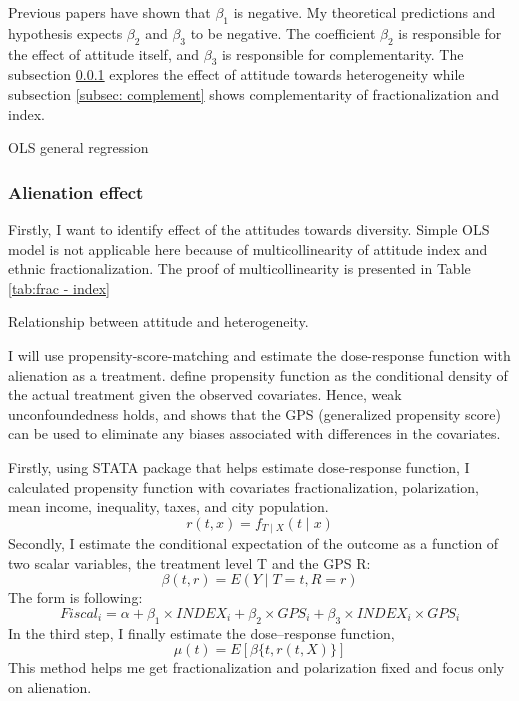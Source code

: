 \documentclass[12pt]{article}
\begin{document}
Previous papers have shown that $\beta_1$ is negative. My theoretical predictions and hypothesis expects $\beta_2$ and $\beta_3$ to be negative. The coefficient $\beta_2$ is responsible for the effect of attitude itself, and $\beta_3$ is responsible for complementarity. The subsection \ref{subsec: alienation} explores the effect of attitude towards heterogeneity while subsection \ref{subsec: complement} shows complementarity of fractionalization and index.

\begin{table}[h!]
    \centering
    \scriptsize
    
    \caption{OLS general regression}
    \label{tab:basic}
\end{table}

\subsubsection{Alienation effect}
\label{subsec: alienation}

Firstly, I want to identify effect of the attitudes towards diversity. Simple OLS model is not applicable here because of multicollinearity of attitude index and ethnic fractionalization. The proof of multicollinearity is presented in Table \ref{tab:frac - index}

\begin{table}[h!]
    \centering
    \scriptsize
    
    \caption{Relationship between attitude and heterogeneity.}
    \label{tab:frac - index}
\end{table}

I will use propensity-score-matching and estimate the dose-response function with alienation as a treatment. \cite{prop} define propensity function as the conditional density of the actual treatment given the observed covariates. Hence, weak unconfoundedness holds, and \cite{prop} shows that the GPS (generalized propensity score) can be used to eliminate any biases associated with differences in the covariates.

Firstly, using \cite{package} STATA package that helps estimate dose-response function, I calculated propensity function with covariates fractionalization, polarization, mean income, inequality, taxes, and city population.
\[ r(t, x)=f_{T \mid X}(t \mid x) \]
Secondly, I estimate the conditional expectation of
the outcome as a function of two scalar variables, the treatment level T and the GPS R:
\[ \beta(t, r)=E(Y \mid T=t, R=r) \]
The form is following:
\[ Fiscal_i = \alpha + \beta_1 \times INDEX_i + \beta_2 \times GPS_i + \beta_3 \times INDEX_i \times GPS_i \]
In the third step, I finally estimate the dose–response function,
\[ \mu(t)=E[\beta\{t, r(t, X)\}] \]
This method helps me get fractionalization and polarization fixed and focus only on alienation.
\end{document}
